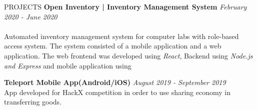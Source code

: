 \documentclass{cv}
\begin{document}
\begin{rSection}{PROJECTS}
    {\bf Open Inventory | Inventory Management System}     \hfill {\em February 2020 - June 2020}
    \\ \\
    Automated inventory management system for computer labs with role-based access system.
    The system consisted of a mobile application and a web application.
    The web frontend was developed using \textit{React}, Backend using \textit{Node.js and Express} and
    mobile application using \textit{}\par

    {\bf Teleport Mobile App(Android/iOS)}                        \hfill {\em August 2019 - September 2019}
    \\
    App developed for HackX competition in order to use sharing economy in transferring goods.  \par
\end{rSection}


\end{document}
